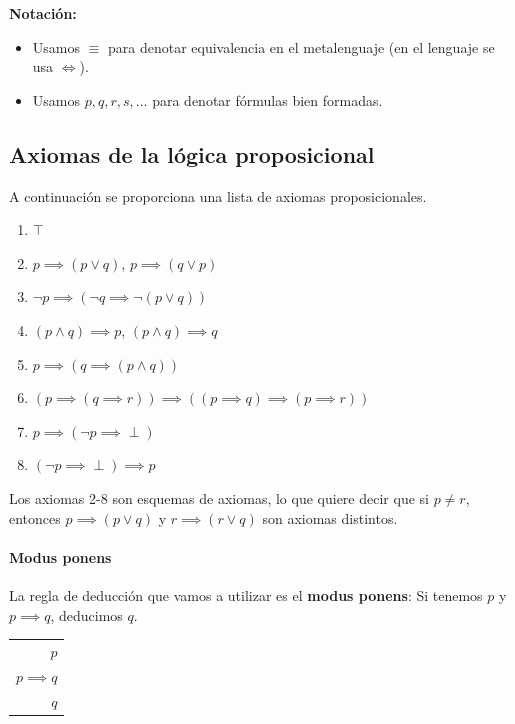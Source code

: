 \newpage
\begin{mdframed}
	\textbf{Notación:}
	\begin{itemize}
	\vspace{-3mm}
	\item Usamos $\equiv$ para denotar equivalencia en el metalenguaje (en el lenguaje se usa $\iff$).

	\item Usamos $p,q,r,s,\hdots$ para denotar fórmulas bien formadas.
	\end{itemize}
\end{mdframed}

\subsection{Axiomas de la lógica proposicional}
A continuación se proporciona una lista de axiomas proposicionales.
\begin{enumerate}
	\item $\top$
	\item $p\implies (p\vee q)$, $p\implies (q\vee p)$
	\item $\neg p \implies (\neg q \implies \neg (p\vee q))$
	\item $(p\wedge q)\implies p$, $(p\wedge q)\implies q$
	\item $p\implies (q\implies (p\wedge q))$
	\item $(p\implies(q\implies r))\implies ((p\implies q)\implies(p\implies r))$
	\item $p\implies(\neg p\implies \perp)$
	\item $(\neg p\implies \perp)\implies p$
\end{enumerate}

Los axiomas 2-8 son esquemas de axiomas, lo que quiere decir que si $p\neq r$, entonces $p\implies (p\vee q)$ y $r\implies (r\vee q)$ son axiomas distintos.

\paragraph*{Modus ponens}\mbox{}

La regla de deducción que vamos a utilizar es el \textbf{modus ponens}: Si tenemos $p$ y $p\implies q$, deducimos $q$.

\begin{center}
	\begin{tabular}{r}
		$p$\\
		$p\implies q$\\
		\hline
		$q$
	\end{tabular}
\end{center}

